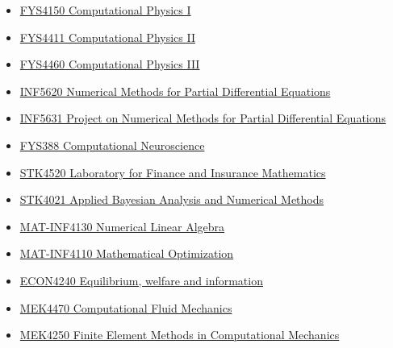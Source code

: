 \documentclass[%
oneside,                 %
final,                   %
10pt]{article}
\begin{document}
\begin{itemize}
\item \href{{http://www.uio.no/studier/emner/matnat/fys/FYS4150/index-eng.html}}{FYS4150 Computational Physics I}

\item \href{{http://www.uio.no/studier/emner/matnat/fys/FYS4411/}}{FYS4411 Computational Physics II}

\item \href{{http://www.uio.no/studier/emner/matnat/fys/FYS4460/}}{FYS4460 Computational Physics III}

\item \href{{http://www.uio.no/studier/emner/matnat/ifi/INF5620/index-eng.html}}{INF5620 Numerical Methods for Partial Differential Equations}

\item \href{{http://www.uio.no/studier/emner/matnat/ifi/INF5631/index-eng.html}}{INF5631 Project on Numerical Methods for Partial Differential Equations}

\item \href{{http://www.nmbu.no/course/FYS388}}{FYS388 Computational Neuroscience}

\item \href{{http://www.uio.no/studier/emner/matnat/math/STK4520/index-eng.html}}{STK4520 Laboratory for Finance and Insurance Mathematics}

\item \href{{http://www.uio.no/studier/emner/matnat/math/STK4021/index-eng.html}}{STK4021 Applied Bayesian Analysis and Numerical Methods}

\item \href{{http://www.uio.no/studier/emner/matnat/math/MAT-INF4130/index-eng.html}}{MAT-INF4130  Numerical Linear Algebra}

\item \href{{http://www.uio.no/studier/emner/matnat/math/MAT-INF4110/index.html}}{MAT-INF4110 Mathematical Optimization}

\item \href{{http://www.uio.no/studier/emner/sv/oekonomi/ECON4240/index.html}}{ECON4240 Equilibrium, welfare and information}

\item \href{{http://www.uio.no/studier/emner/matnat/math/MEK4470/index-eng.html}}{MEK4470  Computational Fluid Mechanics}

\item \href{{http://www.uio.no/studier/emner/matnat/math/MEK4250/index-eng.html}}{MEK4250 Finite Element Methods in Computational Mechanics}
\end{itemize}
\end{document}
